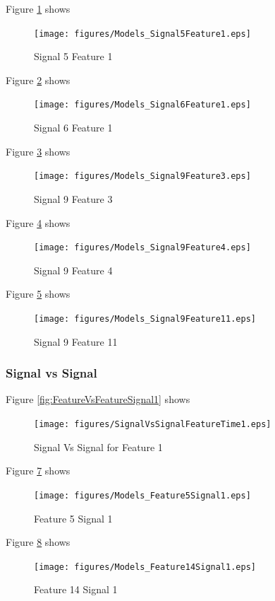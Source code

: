 \documentclass{article}
\begin{document}
Figure \ref{fig:Models_Signal5Feature1} shows 
\begin{figure}[H]
    \centering
    \texttt{[image: figures/Models\_Signal5Feature1.eps]}
    \caption{Signal 5 Feature 1}
    \label{fig:Models_Signal5Feature1}
\end{figure}



Figure \ref{fig:Models_Signal6Feature1} shows 
\begin{figure}[H]
    \centering
    \texttt{[image: figures/Models\_Signal6Feature1.eps]}
    \caption{Signal 6 Feature 1}
    \label{fig:Models_Signal6Feature1}
\end{figure}


Figure \ref{fig:Models_Signal9Feature3} shows 
\begin{figure}[H]
    \centering
    \texttt{[image: figures/Models\_Signal9Feature3.eps]}
    \caption{Signal 9 Feature 3}
    \label{fig:Models_Signal9Feature3}
\end{figure}
Figure \ref{fig:Models_Signal9Feature4} shows 
\begin{figure}[H]
    \centering
    \texttt{[image: figures/Models\_Signal9Feature4.eps]}
    \caption{Signal 9 Feature 4}
    \label{fig:Models_Signal9Feature4}
\end{figure}
Figure \ref{fig:Models_Signal9Feature11} shows 
\begin{figure}[H]
    \centering
    \texttt{[image: figures/Models\_Signal9Feature11.eps]}
    \caption{Signal 9 Feature 11}
    \label{fig:Models_Signal9Feature11}
\end{figure}

\subsubsection{Signal vs Signal}
Figure \ref{fig:FeatureVsFeatureSignal1} shows 
\begin{figure}[H]
    \centering
    \texttt{[image: figures/SignalVsSignalFeatureTime1.eps]}
    \caption{Signal Vs Signal for Feature 1}
    \label{fig:SignalVsSignalFeature1}
\end{figure}


Figure \ref{fig:Models_Feature5Signal1} shows 
\begin{figure}[H]
    \centering
    \texttt{[image: figures/Models\_Feature5Signal1.eps]}
    \caption{Feature 5 Signal 1}
    \label{fig:Models_Feature5Signal1}
\end{figure}


Figure \ref{fig:Models_Feature14Signal1} shows 
\begin{figure}[H]
    \centering
    \texttt{[image: figures/Models\_Feature14Signal1.eps]}
    \caption{Feature 14 Signal 1}
    \label{fig:Models_Feature14Signal1}
\end{figure}
\end{document}

